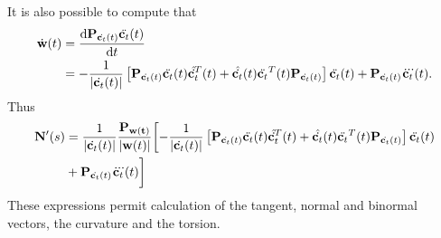 It is also possible to compute that
\begin{equation}
\begin{split}
\dw(t) &= \frac{\d{\mtx{P}_{\dx(t)}\ddx(t)}}{\d{t}}\\ 
&= -\frac{1}{\lvert\dx(t)\rvert}\left[\Pdx\ddx(t)\udx^T(t) + \udx(t)\ddx^T(t)\Pdx\right]\ddx(t) + \mtx{P}_{\dx(t)}\dddx(t).
\end{split}
\end{equation}
Thus
\begin{equation}
\begin{split}
\vct{N}'(\parm) &= \frac{1}{\lvert\dx(t)\rvert}\frac{\mtx{P}_\vct{w(t)}}{\lvert\vct{w}(t)\rvert}\biggl[-\frac{1}{\lvert\dx(t)\rvert}\left[\Pdx\ddx(t)\udx^T(t) + \udx(t)\ddx^T(t)\Pdx\right]\ddx(t)\\ 
&+ \mtx{P}_{\dx(t)}\dddx(t)\biggr]
\end{split}
\end{equation}
These expressions permit calculation of the tangent, normal and binormal vectors, the curvature and the torsion. 
